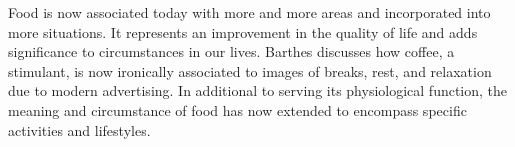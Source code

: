 \documentclass{article}
\begin{document}
Food is now associated today with more and more areas and incorporated into more situations. It represents an improvement in the quality of life and adds significance to circumstances in our lives. Barthes discusses how coffee, a stimulant, is now ironically associated to images of breaks, rest, and relaxation due to modern advertising. In additional to serving its physiological function, the meaning and circumstance of food has now extended to encompass specific activities and lifestyles.
\end{document}
